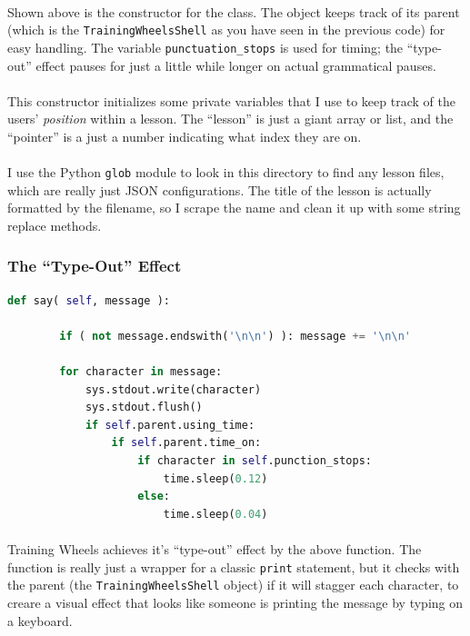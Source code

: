 \documentclass[11pt]{article}
\begin{document}
	\paragraph{} Shown above is the constructor for the class. The object keeps track of its parent (which is the \texttt{TrainingWheelsShell} as you have seen in the previous code) for easy handling. The variable \texttt{punctuation\_stops} is used for timing; the ``type-out'' effect pauses for just a little while longer on actual grammatical pauses.

	\paragraph{} This constructor initializes some private variables that I use to keep track of the users' \textit{position} within a lesson. The ``lesson'' is just a giant array or list, and the ``pointer'' is a just a number indicating what index they are on.

	\paragraph{} I use the Python \texttt{glob} module to look in this directory to find any lesson files, which are really just JSON configurations. The title of the lesson is actually formatted by the filename, so I scrape the name and clean it up with some string replace methods.

	\subsubsection{The ``Type-Out'' Effect}

\begin{lstlisting}[language=Python]
	def say( self, message ):

		if ( not message.endswith('\n\n') ): message += '\n\n'

		for character in message:
			sys.stdout.write(character)
			sys.stdout.flush()
			if self.parent.using_time:
				if self.parent.time_on:
					if character in self.punction_stops:
						time.sleep(0.12)
					else:
						time.sleep(0.04)		
\end{lstlisting}

	\paragraph{}

	\paragraph{} Training Wheels achieves it's ``type-out'' effect by the above function. The function is really just a wrapper for a classic \texttt{print} statement, but it checks with the parent (the \texttt{TrainingWheelsShell} object) if it will stagger each character, to creare a visual effect that looks like someone is printing the message by typing on a keyboard. 
\end{document}
